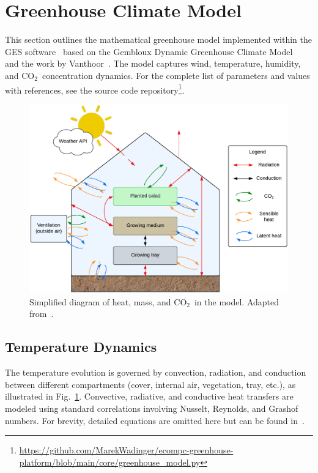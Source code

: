 \documentclass[conference]{IEEEtran}
\newcommand{\coo}{\ensuremath{\mathrm{CO_2}}}
\begin{document}
\section{Greenhouse Climate Model}
\label{sec:greenhouse}
This section outlines the mathematical greenhouse model implemented within the GES software~\cite{Ward2019} based on the Gembloux Dynamic Greenhouse Climate Model~\cite{Mashonjowa2007} and the work by Vanthoor~\cite{Vanthoor2011}. The model captures wind, temperature, humidity, and \coo\ concentration dynamics. For the complete list of parameters and values with references, see the source code repository\footnote{\url{https://github.com/MarekWadinger/ecompc-greenhouse-platform/blob/main/core/greenhouse_model.py}}.
\begin{figure}
    \centering
    \includegraphics[width=\linewidth]{figures/diagramGH.pdf}
    \caption{Simplified diagram of heat, mass, and \coo\ in the model. Adapted from~\cite{Ward2019}.}\label{fig:diagram}
\end{figure}

\subsection{Temperature Dynamics}\label{subsec:temperature}

The temperature evolution is governed by convection, radiation, and conduction between different compartments (cover, internal air, vegetation, tray, etc.), as illustrated in Fig.~\ref{fig:diagram}.
Convective, radiative, and conductive heat transfers are modeled using standard correlations involving Nusselt, Reynolds, and Grashof numbers. For brevity, detailed equations are omitted here but can be found in~\cite{Ward2019,Vanthoor2011}.
\end{document}
